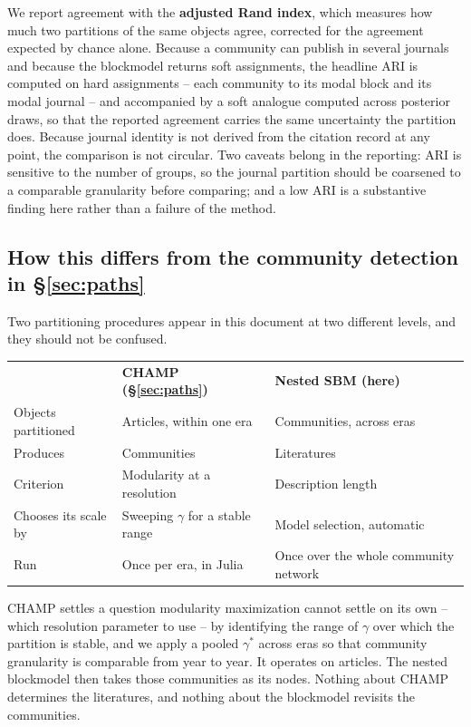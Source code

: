 \documentclass[11pt]{article}
\newcommand{\doublerule}{%
  \specialrule{\lightrulewidth}{0pt}{\doublerulesep}%
  \specialrule{\lightrulewidth}{0pt}{0pt}}
\begin{document}
We report agreement with the \textbf{adjusted Rand index}, which measures how much two
partitions of the same objects agree, corrected for the agreement expected by chance alone.
Because a community can publish in several journals and because the blockmodel returns soft
assignments, the headline ARI is computed on hard assignments -- each community to its modal
block and its modal journal -- and accompanied by a soft analogue computed across posterior
draws, so that the reported agreement carries the same uncertainty the partition does. Because
journal identity is not derived from the citation record at any point, the comparison is not
circular. Two caveats belong in the reporting: ARI is sensitive to the number of groups, so
the journal partition should be coarsened to a comparable granularity before comparing; and a
low ARI is a substantive finding here rather than a failure of the method.

\subsection{How this differs from the community detection in \S\ref{sec:paths}}

Two partitioning procedures appear in this document at two different levels, and they should
not be confused.

\begin{center}
\small
\begin{tabular}{@{}lll@{}}
\toprule
 & \textbf{CHAMP (\S\ref{sec:paths})} & \textbf{Nested SBM (here)}\\
\doublerule
Objects partitioned & Articles, within one era & Communities, across eras\\
Produces            & Communities            & Literatures\\
Criterion           & Modularity at a resolution & Description length\\
Chooses its scale by & Sweeping $\gamma$ for a stable range & Model selection, automatic\\
Run                 & Once per era, in Julia & Once over the whole community network\\
\bottomrule
\end{tabular}
\end{center}

CHAMP settles a question modularity maximization cannot settle on its own -- which resolution
parameter to use -- by identifying the range of $\gamma$ over which the partition is stable,
and we apply a pooled $\gamma^{*}$ across eras so that community granularity is comparable
from year to year. It operates on articles. The nested blockmodel then takes those communities
as its nodes. Nothing about CHAMP determines the literatures, and nothing about the
blockmodel revisits the communities.
\end{document}
